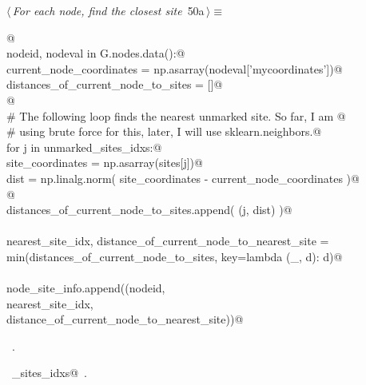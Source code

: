 \documentclass[11.5pt]{report}
\begin{document}
\vspace{-0.8cm} \newchunk
\begin{flushleft} \small
\begin{minipage}{\linewidth}\label{scrap76}\raggedright\small
{} $\langle\,${\itshape For each node, find the closest site}\nobreak\ {\footnotesize {50a}}$\,\rangle\equiv$
\vspace{-1ex}
\begin{list}{}{} \item
\mbox{}\verb@   @\\
\mbox{}\verb@for nodeid, nodeval in G.nodes.data():@\\
\mbox{}\verb@    current_node_coordinates = np.asarray(nodeval['mycoordinates'])@\\
\mbox{}\verb@    distances_of_current_node_to_sites = []@\\
\mbox{}\verb@               @\\
\mbox{}\verb@    # The following loop finds the nearest unmarked site. So far, I am @\\
\mbox{}\verb@    # using brute force for this, later, I will use sklearn.neighbors.@\\
\mbox{}\verb@    for j in unmarked_sites_idxs:@\\
\mbox{}\verb@        site_coordinates = np.asarray(sites[j])@\\
\mbox{}\verb@        dist             =  np.linalg.norm( site_coordinates - current_node_coordinates )@\\
\mbox{}\verb@                    @\\
\mbox{}\verb@        distances_of_current_node_to_sites.append( (j, dist) )@\\
\mbox{}\verb@@\\
\mbox{}\verb@        nearest_site_idx, distance_of_current_node_to_nearest_site = \@\\
\mbox{}\verb@                        min(distances_of_current_node_to_sites, key=lambda (_, d): d)@\\
\mbox{}\verb@@\\
\mbox{}\verb@        node_site_info.append((nodeid, \@\\
\mbox{}\verb@                                  nearest_site_idx, \@\\
\mbox{}\verb@                                  distance_of_current_node_to_nearest_site))@\\
\mbox{}\verb@@{\NWsep}
\end{list}
\vspace{-1.5ex}
\footnotesize
\begin{list}{}{\setlength{\itemsep}{-\parsep}\setlength{\itemindent}{-\leftmargin}}
\item \NWtxtMacroRefIn\ .
\item \NWtxtIdentsUsed\nobreak\  \verb@unmarked_sites_idxs@\nobreak\ .
\item{}
\end{list}
\end{minipage}\vspace{4ex}
\end{flushleft}
\end{document}
